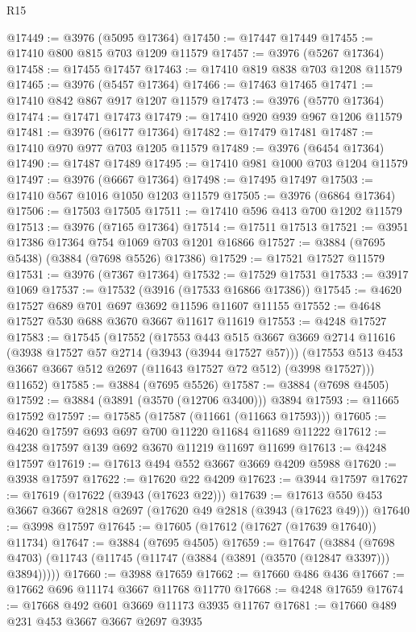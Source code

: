 \begin{lexlean}{R15}
\begin{coremodule}
@17449 := @3976 (@5095 @17364)
@17450 := @17447 @17449
@17455 := @17410 @800 @815 @703 @1209 @11579
@17457 := @3976 (@5267 @17364)
@17458 := @17455 @17457
@17463 := @17410 @819 @838 @703 @1208 @11579
@17465 := @3976 (@5457 @17364)
@17466 := @17463 @17465
@17471 := @17410 @842 @867 @917 @1207 @11579
@17473 := @3976 (@5770 @17364)
@17474 := @17471 @17473
@17479 := @17410 @920 @939 @967 @1206 @11579
@17481 := @3976 (@6177 @17364)
@17482 := @17479 @17481
@17487 := @17410 @970 @977 @703 @1205 @11579
@17489 := @3976 (@6454 @17364)
@17490 := @17487 @17489
@17495 := @17410 @981 @1000 @703 @1204 @11579
@17497 := @3976 (@6667 @17364)
@17498 := @17495 @17497
@17503 := @17410 @567 @1016 @1050 @1203 @11579
@17505 := @3976 (@6864 @17364)
@17506 := @17503 @17505
@17511 := @17410 @596 @413 @700 @1202 @11579
@17513 := @3976 (@7165 @17364)
@17514 := @17511 @17513
@17521 := @3951 @17386 @17364 @754 @1069 @703 @1201 @16866
@17527 := @3884 (@7695 @5438) (@3884 (@7698 @5526) @17386)
@17529 := @17521 @17527 @11579
@17531 := @3976 (@7367 @17364)
@17532 := @17529 @17531
@17533 := @3917 @1069
@17537 := @17532 (@3916 (@17533 @16866 @17386))
@17545 := @4620 @17527 @689 @701 @697 @3692 @11596 @11607 @11155
@17552 := @4648 @17527 @530 @688 @3670 @3667 @11617 @11619
@17553 := @4248 @17527
@17583 := @17545
    (@17552
      (@17553
        @443
        @515
        @3667
        @3669
        @2714
        @11616
        (@3938 @17527 @57 @2714 (@3943 (@3944 @17527 @57)))
        (@17553 @513 @453 @3667 @3667 @512 @2697 (@11643 @17527 @72 @512) (@3998 @17527)))
      @11652)
@17585 := @3884 (@7695 @5526)
@17587 := @3884 (@7698 @4505)
@17592 := @3884 (@3891 (@3570 (@12706 @3400))) @3894
@17593 := @11665 @17592
@17597 := @17585 (@17587 (@11661 (@11663 @17593)))
@17605 := @4620 @17597 @693 @697 @700 @11220 @11684 @11689 @11222
@17612 := @4238 @17597 @139 @692 @3670 @11219 @11697 @11699
@17613 := @4248 @17597
@17619 := @17613 @494 @552 @3667 @3669 @4209 @5988
@17620 := @3938 @17597
@17622 := @17620 @22 @4209
@17623 := @3944 @17597
@17627 := @17619 (@17622 (@3943 (@17623 @22)))
@17639 := @17613 @550 @453 @3667 @3667 @2818 @2697 (@17620 @49 @2818 (@3943 (@17623 @49)))
@17640 := @3998 @17597
@17645 := @17605 (@17612 (@17627 (@17639 @17640)) @11734)
@17647 := @3884 (@7695 @4505)
@17659 := @17647
    (@3884 (@7698 @4703) (@11743 (@11745 (@11747 (@3884 (@3891 (@3570 (@12847 @3397))) @3894)))))
@17660 := @3988 @17659
@17662 := @17660 @486 @436
@17667 := @17662 @696 @11174 @3667 @11768 @11770
@17668 := @4248 @17659
@17674 := @17668 @492 @601 @3669 @11173 @3935 @11767
@17681 := @17660 @489 @231 @453 @3667 @3667 @2697 @3935

\end{coremodule}
\end{lexlean}
